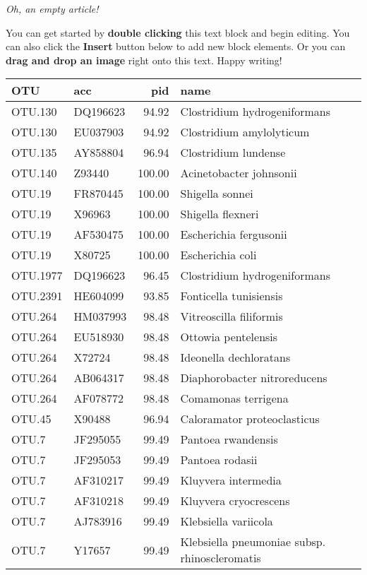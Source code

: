 \textit{Oh, an empty article!} 

You can get started by \textbf{double clicking} this text block and begin editing. You can also click the \textbf{Insert} button below to add new block elements. Or you can \textbf{drag and drop an image} right onto this text. Happy writing!

\begin{tabular}{llrl}
  \hline
OTU & acc & pid & name \\ 
  \hline
OTU.130 & DQ196623 & 94.92 & Clostridium hydrogeniformans \\ 
  OTU.130 & EU037903 & 94.92 & Clostridium amylolyticum \\ 
  OTU.135 & AY858804 & 96.94 & Clostridium lundense \\ 
  OTU.140 & Z93440 & 100.00 & Acinetobacter johnsonii \\ 
  OTU.19 & FR870445 & 100.00 & Shigella sonnei \\ 
  OTU.19 & X96963 & 100.00 & Shigella flexneri \\ 
  OTU.19 & AF530475 & 100.00 & Escherichia fergusonii \\ 
  OTU.19 & X80725 & 100.00 & Escherichia coli \\ 
  OTU.1977 & DQ196623 & 96.45 & Clostridium hydrogeniformans \\ 
  OTU.2391 & HE604099 & 93.85 & Fonticella tunisiensis \\ 
  OTU.264 & HM037993 & 98.48 & Vitreoscilla filiformis \\ 
  OTU.264 & EU518930 & 98.48 & Ottowia pentelensis \\ 
  OTU.264 & X72724 & 98.48 & Ideonella dechloratans \\ 
  OTU.264 & AB064317 & 98.48 & Diaphorobacter nitroreducens \\ 
  OTU.264 & AF078772 & 98.48 & Comamonas terrigena \\ 
  OTU.45 & X90488 & 96.94 & Caloramator proteoclasticus \\ 
  OTU.7 & JF295055 & 99.49 & Pantoea rwandensis \\ 
  OTU.7 & JF295053 & 99.49 & Pantoea rodasii \\ 
  OTU.7 & AF310217 & 99.49 & Kluyvera intermedia \\ 
  OTU.7 & AF310218 & 99.49 & Kluyvera cryocrescens \\ 
  OTU.7 & AJ783916 & 99.49 & Klebsiella variicola \\ 
  OTU.7 & Y17657 & 99.49 & Klebsiella pneumoniae subsp. rhinoscleromatis \\ 

\end{tabular}
